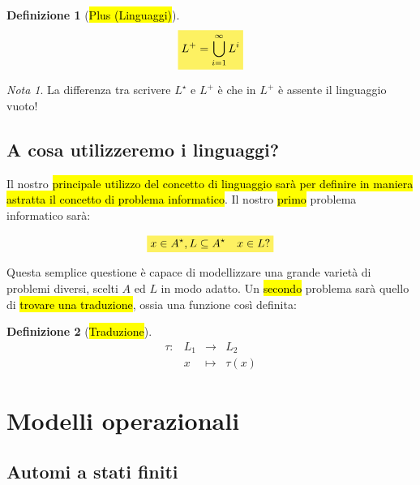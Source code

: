 \documentclass[a4paper,11pt,twoside]{article}
\theoremstyle{plain}
\theoremstyle{definition}
\newtheorem{defn}{Definizione}[section]
\theoremstyle{remark}
\newtheorem*{nota}{Nota}
\newcommand{\mhl}[1]{\colorbox{hlcolor}{$\displaystyle #1$}}
\begin{document}
\begin{defn}[\hl{Plus (Linguaggi)}]\label{def:plus-linguaggi}
  \begin{equation}
    \mhl{ L^+ = \bigcup^{\infty}_{i=1} L^i }
  \end{equation}
\end{defn}

\begin{nota}
  La differenza tra scrivere $L^\star$ e $L^+$ è che in $L^+$ è assente il
  linguaggio vuoto!
\end{nota}

\subsection{A cosa utilizzeremo i linguaggi?}

Il nostro \hl{principale utilizzo del concetto di linguaggio sarà per definire
in maniera astratta il concetto di problema informatico}. Il nostro \hl{primo}
problema informatico sarà:

\begin{equation}
  \mhl{ x \in A^\star, L \subseteq A^\star \quad  x \in L? }
\end{equation}

Questa semplice questione è capace di modellizzare una grande varietà di
problemi diversi, scelti $A$ ed $L$ in modo adatto. Un \hl{secondo} problema sarà
quello di \hl{trovare una traduzione}, ossia una funzione così definita:

\begin{defn}[\hl{Traduzione}]\label{def:traduzione}
  \begin{equation}
    \begin{array}{cccc}
      \tau: & L_1 & \to     & L_2 \\
            & x   & \mapsto & \tau(x)
    \end{array}
  \end{equation}
\end{defn}

\section{Modelli operazionali}\label{sec:modelli-operazionali}

\subsection{Automi a stati finiti}\label{sec:fsa}
\end{document}

